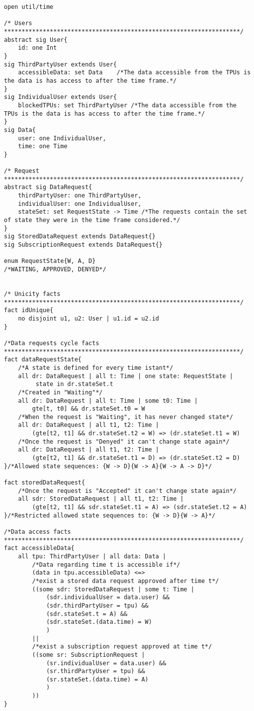 \begin{lstlisting}
open util/time

/* Users
*******************************************************************/
abstract sig User{
	id: one Int
}
sig ThirdPartyUser extends User{
	accessibleData: set Data	/*The data accessible from the TPUs is the data is has access to after the time frame.*/
}
sig IndividualUser extends User{
	blockedTPUs: set ThirdPartyUser /*The data accessible from the TPUs is the data is has access to after the time frame.*/
}	
sig Data{
	user: one IndividualUser,
	time: one Time
}

/* Request
*******************************************************************/
abstract sig DataRequest{
	thirdPartyUser: one ThirdPartyUser,
	individualUser: one IndividualUser,
	stateSet: set RequestState -> Time /*The requests contain the set of state they were in the time frame considered.*/
}
sig StoredDataRequest extends DataRequest{}
sig SubscriptionRequest extends DataRequest{}

enum RequestState{W, A, D}
/*WAITING, APPROVED, DENYED*/


/* Unicity facts
*******************************************************************/
fact idUnique{
	no disjoint u1, u2: User | u1.id = u2.id
}

/*Data requests cycle facts
*******************************************************************/
fact dataRequestState{
	/*A state is defined for every time istant*/
	all dr: DataRequest | all t: Time | one state: RequestState |
		 state in dr.stateSet.t
	/*Created in "Waiting"*/
	all dr: DataRequest | all t: Time | some t0: Time | 
		gte[t, t0] && dr.stateSet.t0 = W
	/*When the request is "Waiting", it has never changed state*/
	all dr: DataRequest | all t1, t2: Time | 
		(gte[t2, t1] && dr.stateSet.t2 = W) => (dr.stateSet.t1 = W)
	/*Once the request is "Denyed" it can't change state again*/
	all dr: DataRequest | all t1, t2: Time | 
		(gte[t2, t1] && dr.stateSet.t1 = D) => (dr.stateSet.t2 = D)
}/*Allowed state sequences: {W -> D}{W -> A}{W -> A -> D}*/

fact storedDataRequest{
	/*Once the request is "Accepted" it can't change state again*/
	all sdr: StoredDataRequest | all t1, t2: Time | 
		(gte[t2, t1] && sdr.stateSet.t1 = A) => (sdr.stateSet.t2 = A)
}/*Restricted allowed state sequences to: {W -> D}{W -> A}*/

/*Data access facts
*******************************************************************/
fact accessibleData{
	all tpu: ThirdPartyUser | all data: Data |
		/*Data regarding time t is accessible if*/
		(data in tpu.accessibleData) <=> 
		/*exist a stored data request approved after time t*/
		((some sdr: StoredDataRequest | some t: Time |
			(sdr.individualUser = data.user) && 
			(sdr.thirdPartyUser = tpu) &&
			(sdr.stateSet.t = A) &&
			(sdr.stateSet.(data.time) = W)
			)
		||
		/*exist a subscription request approved at time t*/
		((some sr: SubscriptionRequest |
			(sr.individualUser = data.user) && 
			(sr.thirdPartyUser = tpu) &&
			(sr.stateSet.(data.time) = A)
			)
		))
}


\end{lstlisting}
